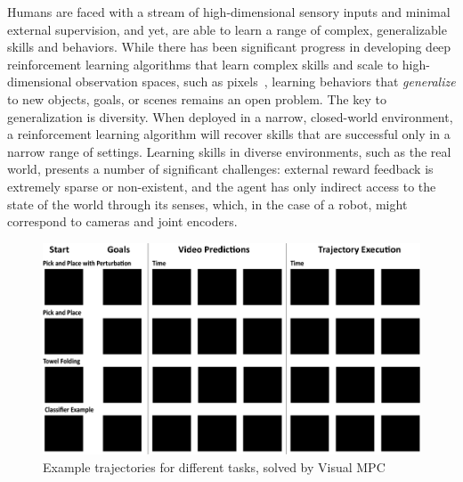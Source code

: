 
Humans are faced with a stream of high-dimensional sensory inputs and minimal external supervision, and yet, are able to learn a range of complex, generalizable skills and behaviors.
While there has been significant progress in developing deep reinforcement learning algorithms that learn complex skills and scale to high-dimensional observation spaces, such as pixels~\cite{tdgammon,atari,e2e,alphago}, learning behaviors that \emph{generalize} to new objects, goals, or scenes remains an open problem.
The key to generalization is diversity. When deployed in a narrow, closed-world environment, a reinforcement learning algorithm will recover skills that are successful only in a narrow range of settings. 
Learning skills in diverse  environments, such as the real world, presents a number of significant challenges: external reward feedback is extremely sparse or non-existent, and the agent has only indirect access to the state of the world through its senses, which, in the case of a robot, might correspond to cameras and joint encoders.

\begin{figure}[t]
	\centering
	\includegraphics[width=1\columnwidth,trim={0mm 0 0 0},clip]{images_general/tile_rough.png}
	\caption{\small{Example trajectories for different tasks, solved by Visual MPC}}
	\label{fig:example_traj}
\end{figure}

